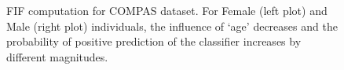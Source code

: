 \begin{figure}[t!]	
	\centering
	\vspace{-2ex}
	\caption[FIF computation using {\fvgm}]{FIF computation for COMPAS dataset. For Female (left plot) and Male (right plot) individuals,  the influence of `age' decreases and the probability of positive prediction of the classifier increases  by different magnitudes.}\label{fvgm_fig:influence function}
\end{figure}




